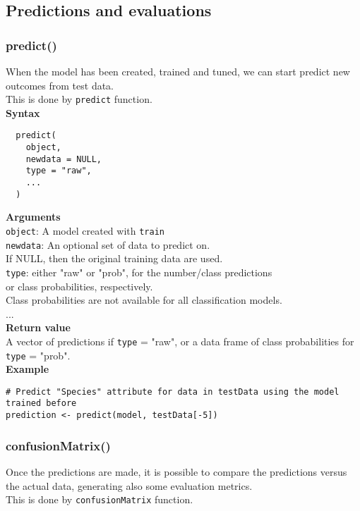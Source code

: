 \documentclass{article}
\begin{document}
\subsection{Predictions and evaluations}

\subsubsection{predict()}
When the model has been created, trained and tuned, we can start predict new outcomes from test data.\\
This is done by \texttt{predict} function.\\

\textbf{Syntax}
\begin{verbatim}
  predict(
    object,
    newdata = NULL,
    type = "raw",
    ...
  )
\end{verbatim}

\textbf{Arguments}\\

\texttt{object}: A model created with \texttt{train}\\
\texttt{newdata}: An optional set of data to predict on.\\
\phantom{................}If NULL, then the original training data are used.\\
\texttt{type}: either "raw" or "prob", for the number/class predictions \\
\phantom{..........}or class probabilities, respectively.\\
\phantom{..........}Class probabilities are not available for all classification models.\\
...\\

\textbf{Return value}\\

A vector of predictions if \texttt{type} = "raw", or a data frame of class probabilities for \texttt{type} = "prob".\\

\textbf{Example}\\
\begin{lstlisting}
# Predict "Species" attribute for data in testData using the model trained before
prediction <- predict(model, testData[-5])
\end{lstlisting}

\subsubsection{confusionMatrix()}
Once the predictions are made, it is possible to compare the predictions versus the actual data, generating also some evaluation metrics.\\
This is done by \texttt{confusionMatrix} function.\\
\end{document}

